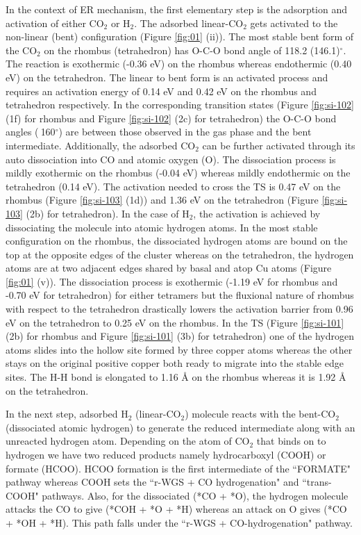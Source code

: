In the context of ER mechanism, the first elementary step is the adsorption and activation of either CO$_2$ or H$_2$. The adsorbed linear-CO$_2$ gets activated to the non-linear (bent) configuration (Figure \ref{fig:01} (ii)). The most stable bent form of the CO$_2$ on the rhombus (tetrahedron) has O-C-O bond angle of 118.2 (146.1)$^{\circ}$. The reaction is exothermic (-0.36 eV) on the rhombus whereas endothermic (0.40 eV) on the tetrahedron. The linear to bent form is an activated process and requires an activation energy of 0.14 eV and 0.42 eV on the rhombus and tetrahedron respectively. In the corresponding transition states (Figure \ref{fig:si-102} (1f) for rhombus and Figure \ref{fig:si-102} (2c) for tetrahedron) the O-C-O bond angles ($~$160$^{\circ}$) are between those observed in the gas phase and the bent intermediate. Additionally, the adsorbed CO$_2$ can be further activated through its auto dissociation into CO and atomic oxygen (O). The dissociation process is mildly exothermic on the rhombus (-0.04 eV) whereas mildly endothermic on the tetrahedron (0.14 eV). The activation needed to cross the TS is 0.47 eV on the rhombus (Figure \ref{fig:si-103} (1d)) and 1.36 eV on the tetrahedron (Figure \ref{fig:si-103} (2b) for tetrahedron). In the case of H$_2$, the activation is achieved by dissociating the molecule into atomic hydrogen atoms. In the most stable configuration on the rhombus, the dissociated hydrogen atoms are bound on the top at the opposite edges of the cluster whereas on the tetrahedron, the hydrogen atoms are at two adjacent edges shared by basal and atop Cu atoms (Figure \ref{fig:01} (v)). The dissociation process is exothermic (-1.19 eV for rhombus and -0.70 eV for tetrahedron) for either tetramers but the fluxional nature of rhombus\cite{mondal2020role} with respect to the tetrahedron drastically lowers the activation barrier from 0.96 eV on the tetrahedron to 0.25 eV on the rhombus. In the TS (Figure \ref{fig:si-101} (2b) for rhombus and Figure \ref{fig:si-101}  (3b) for tetrahedron) one of the hydrogen atoms slides into the hollow site formed by three copper atoms whereas the other stays on the original positive copper both ready to migrate into the stable edge sites. The H-H bond is elongated to 1.16 \AA{} on the rhombus whereas it is 1.92 \AA{} on the tetrahedron. 

In the next step, adsorbed H$_2$ (linear-CO$_2$) molecule reacts with the bent-CO$_2$ (dissociated atomic hydrogen) to generate the reduced intermediate along with an unreacted hydrogen atom. Depending on the atom of CO$_2$ that binds on to hydrogen we have two reduced products namely hydrocarboxyl (COOH) or formate (HCOO). HCOO formation is the first intermediate of the ``FORMATE" pathway whereas COOH sets the ``r-WGS + CO hydrogenation" and ``trans-COOH" pathways. Also, for the dissociated (*CO + *O), the hydrogen molecule attacks the CO to give (*COH + *O + *H) whereas an attack on O gives (*CO + *OH + *H). This path falls under the ``r-WGS + CO-hydrogenation" pathway. 

